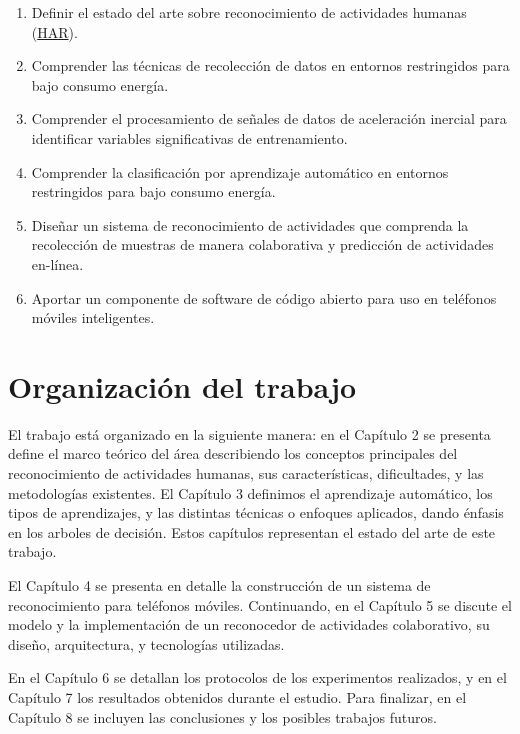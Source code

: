 \label{objetivos-especuxedficos}
\begin{enumerate}
\item \label{enu:obe1}Definir el estado del arte sobre reconocimiento de
actividades humanas (\hyperlink{abbr}{HAR}). 
\item \label{enu:obe2}Comprender las técnicas de recolección de datos en
entornos restringidos para bajo consumo energía. 
\item \label{enu:obe3}Comprender el procesamiento de señales de datos de
aceleración inercial para identificar variables significativas de
entrenamiento. 
\item \label{enu:obe4}Comprender la clasificación por aprendizaje automático
en entornos restringidos para bajo consumo energía. 
\item \label{enu:obe5}Diseñar un sistema de reconocimiento de actividades
que comprenda la recolección de muestras de manera colaborativa y
predicción de actividades en-línea. 
\item \label{enu:obe6}Aportar un componente de software de código abierto
para uso en teléfonos móviles inteligentes. 
\end{enumerate}

\section{Organización del trabajo}

\label{organizaciuxf3n-del-trabajo}

El trabajo está organizado en la siguiente manera: en el Capítulo
2 se presenta define el marco teórico del área describiendo los conceptos
principales del reconocimiento de actividades humanas, sus características,
dificultades, y las metodologías existentes. El Capítulo 3 definimos
el aprendizaje automático, los tipos de aprendizajes, y las distintas
técnicas o enfoques aplicados, dando énfasis en los arboles de decisión.
Estos capítulos representan el estado del arte de este trabajo.

El Capítulo 4 se presenta en detalle la construcción de un sistema
de reconocimiento para teléfonos móviles. Continuando, en el Capítulo
5 se discute el modelo y la implementación de un reconocedor de actividades
colaborativo, su diseño, arquitectura, y tecnologías utilizadas.

En el Capítulo 6 se detallan los protocolos de los experimentos realizados,
y en el Capítulo 7 los resultados obtenidos durante el estudio. Para
finalizar, en el Capítulo 8 se incluyen las conclusiones y los posibles
trabajos futuros. 
